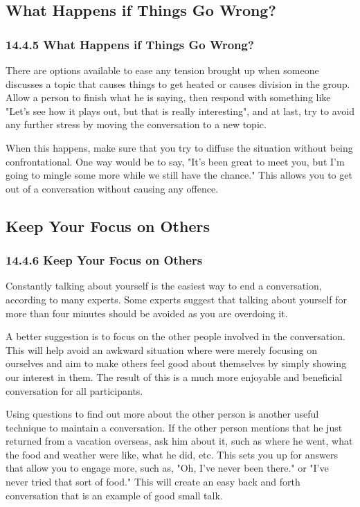 \documentclass[aspectratio=169,UTF8,c]{beamer}%
\begin{document}
\subsection{What Happens if Things Go Wrong?}
\begin{frame}
	\frametitle{14.4.5 What Happens if Things Go Wrong?}
	There are options available to ease any tension brought up when someone discusses a topic that causes things to get heated or causes division in the group. Allow a person to finish what he is saying, then respond with something like "Let's see how it plays out, but that is really interesting", and at last, try to avoid any further stress by moving the conversation to a new topic.
	
	When this happens, make sure that you try to diffuse the situation without being confrontational. One way would be to say, "It's been great to meet you, but I'm going to mingle some more while we still have the chance." This allows you to get out of a conversation without causing any offence.
\end{frame}
\subsection{Keep Your Focus on Others}
\begin{frame}
	\frametitle{14.4.6 Keep Your Focus on Others}
	Constantly talking about yourself is the easiest way to end a conversation, according to many experts. Some experts suggest that talking about yourself for more than four minutes should be avoided as you are overdoing it.
	
	A better suggestion is to focus on the other people involved in the conversation. This will help avoid an awkward situation where were merely focusing on ourselves and aim to make others feel good about themselves by simply showing our interest in them. The result of this is a much more enjoyable and beneficial conversation for all participants.
	
	Using questions to find out more about the other person is another useful technique to maintain a conversation. If the other person mentions that he just returned from a vacation overseas, ask him about it, such as where he went, what the food and weather were like, what he did, etc. This sets you up for answers that allow you to engage more, such as, "Oh, I've never been there." or "I've never tried that sort of food." This will create an easy back and forth conversation that is an example of good small talk.
\end{frame}
\end{document}
